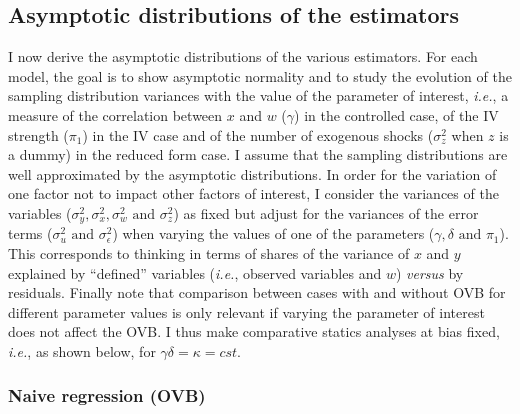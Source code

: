 \documentclass[usletter, 12pt]{article}
\begin{document}
				
		
		\subsection{Asymptotic distributions of the estimators}\label{maths_asymptotics}			 
			
			I now derive the asymptotic distributions of the various estimators. For each model, the goal is to show asymptotic normality and to study the evolution of the sampling distribution variances with the value of the parameter of interest, \textit{i.e.}, a measure of the correlation between $x$ and $w$ ($\gamma$) in the controlled case, of the IV strength ($\pi_{1}$) in the IV case and of the number of exogenous shocks ($\sigma_{z}^{2}$ when $z$ is a dummy) in the reduced form case. I assume that the sampling distributions are well approximated by the asymptotic distributions. %
			In order for the variation of one factor not to impact other factors of interest, I consider the variances of the variables ($\sigma_{y}^{2}, \sigma_{x}^{2}, \sigma_{w}^{2} \text{ and } \sigma_{z}^{2}$) as fixed but adjust for the variances of the error terms ($\sigma_{u}^{2} \text{ and } \sigma_{\epsilon}^{2}$) when varying the values of one of the parameters ($\gamma, \delta \text{ and } \pi_{1}$). This corresponds to thinking in terms of shares of the variance of $x$ and $y$ explained by ``defined'' variables (\textit{i.e.}, observed variables and $w$) \textit{versus} by residuals. Finally note that comparison between cases with and without OVB for different parameter values is only relevant if varying the parameter of interest does not affect the OVB. I thus make comparative statics analyses at bias fixed, \textit{i.e.}, as shown below, for $\gamma \delta = \kappa = cst$.
			

			\subsubsection{Naive regression (OVB)}\label{formal_proof_ovb}
			
\end{document}
